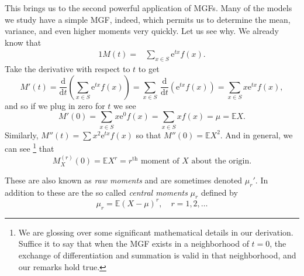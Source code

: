 \documentclass[captions=tableheading]{scrbook}
\begin{document}
This brings us to the second powerful application of MGFs. Many of the models we study have a simple MGF, indeed, which permits us to determine the mean, variance, and even higher moments very quickly. Let us see why. We already know that 
\begin{alignat*}{1}
M(t)= & \sum_{x\in S}\mathrm{e}^{tx}f(x).
\end{alignat*}
Take the derivative with respect to \(t\) to get
\begin{equation}
M'(t)=\frac{\mathrm{d}}{\mathrm{d} t}\left(\sum_{x\in S}\mathrm{e}^{tx}f(x)\right)=\sum_{x\in S}\ \frac{\mathrm{d}}{\mathrm{d} t}\left(\mathrm{e}^{tx}f(x)\right)=\sum_{x\in S}x\mathrm{e}^{tx}f(x),
\end{equation}
and so if we plug in zero for \(t\) we see
\begin{equation}
M'(0)=\sum_{x\in S}x\mathrm{e}^{0}f(x)=\sum_{x\in S}xf(x)=\mu=\mathbb{E} X.
\end{equation}
Similarly, \(M''(t)=\sum x^{2}\mathrm{e}^{tx}f(x)\) so that \(M''(0)=\mathbb{E} X^{2}\). And in general, we can see
\footnote{We are glossing over some significant mathematical details in our derivation. Suffice it to say that when the MGF exists in a neighborhood of \(t=0\), the exchange of differentiation and summation is valid in that neighborhood, and our remarks hold true.}
that
\begin{equation}
M_{X}^{(r)}(0)=\mathbb{E} X^{r}=\mbox{\(r^{\mathrm{th}}\) moment of \(X\) about the origin.}
\end{equation}

These are also known as \emph{raw moments} and are sometimes denoted \(\mu_{r}'\). In addition to these are the so called \emph{central moments} \(\mu_{r}\) defined by
\begin{equation}
\mu_{r}=\mathbb{E}(X-\mu)^{r},\quad r=1,2,\ldots
\end{equation}
\end{document}
